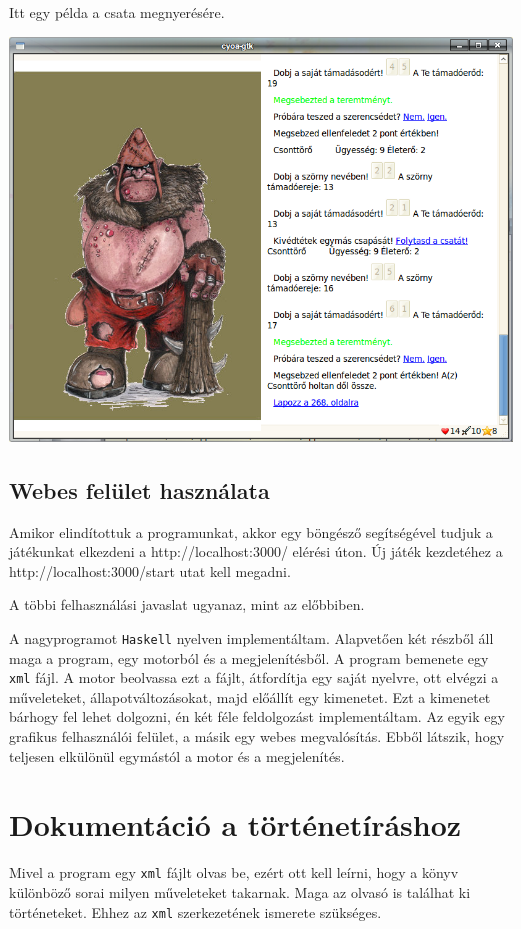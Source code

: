 \documentclass[12pt,a4paper,oneside]{report}
\newcommand{\proglang}{\texttt}
\begin{document}
        Itt egy példa a csata megnyerésére.
        
        \includegraphics[scale=0.5]{screenshot_014.png}

      \subsection{Webes felület használata}
        Amikor elindítottuk a programunkat, akkor egy böngésző
        segítségével tudjuk a játékunkat elkezdeni a
        http://localhost:3000/ elérési úton. Új játék kezdetéhez a
        http://localhost:3000/start utat kell megadni.

        A többi felhasználási javaslat ugyanaz, mint az előbbiben.
      
 A nagyprogramot \proglang{Haskell}
nyelven implementáltam. Alapvetően két részből áll maga a program, egy
motorból és a megjelenítésből. A program bemenete egy \proglang{xml}
fájl. A motor beolvassa ezt a fájlt, átfordítja egy saját nyelvre, ott
elvégzi a műveleteket, állapotváltozásokat, majd előállít egy
kimenetet. Ezt a kimenetet bárhogy fel lehet dolgozni, én két féle
feldolgozást implementáltam. Az egyik egy graf{}ikus felhasználói
felület, a másik egy webes megvalósítás. Ebből látszik, hogy teljesen
elkülönül egymástól a motor és a megjelenítés.

  \section{Dokumentáció a történetíráshoz}
    Mivel a program egy \proglang{xml} fájlt olvas be, ezért ott kell
    leírni, hogy a könyv különböző sorai milyen műveleteket
    takarnak. Maga az olvasó is találhat ki történeteket. Ehhez az
    \proglang{xml} szerkezetének ismerete szükséges.
\end{document}
